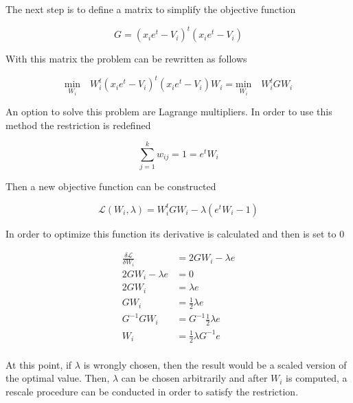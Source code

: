 \documentclass[12pt,journal]{IEEEtran}
\begin{document}
    The next step is to define a matrix to simplify the objective function

    \begin{equation*}
        G = (x_i e^t - V_i)^t (x_i e^t - V_i)
    \end{equation*}

    With this matrix the problem can be rewritten as follows

    \begin{equation*}
            \underset{W_i}{\text{min}} \quad W_i^t(x_i e^t - V_i)^t (x_i e^t - V_i) W_i
            =
            \underset{W_i}{\text{min}} \quad W_i^t G W_i
    \end{equation*}

    An option to solve this problem are Lagrange multipliers. In order to use
    this method the restriction is redefined

    \begin{equation*}
        \sum_{j=1}^k w_{ij} = 1 = e^t W_i
    \end{equation*}

    Then a new objective function can be constructed

    \begin{equation*}
            \mathcal{L}(W_i, \lambda) = W_i^t G W_i - \lambda (e^t W_i - 1)
    \end{equation*}

    In order to optimize this function its derivative is calculated and then is
    set to 0

    \begin{equation*}
        \begin{aligned}
            \frac{\delta \mathcal{L}}{\delta W_i} &= 2 G W_i - \lambda e\\
            2 G W_i - \lambda e &= 0 \\
            2 G W_i &= \lambda e \\
            G W_i &= \frac{1}{2} \lambda e \\
            G^{-1} G W_i &= G^{-1} \frac{1}{2} \lambda e \\
            W_i &= \frac{1}{2} \lambda G^{-1} e \\
        \end{aligned}
    \end{equation*}

    At this point, if $\lambda$ is wrongly chosen, then the result would be a
    scaled version of the optimal value. Then, $\lambda$ can be chosen
    arbitrarily and after $W_i$ is computed, a rescale procedure can be
    conducted in order to satisfy the restriction.\\
\end{document}
